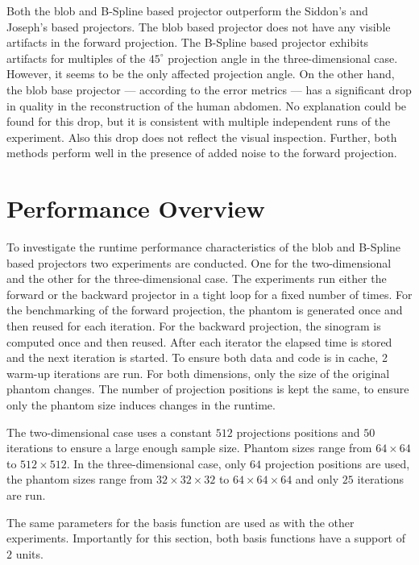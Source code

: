 Both the blob and B-Spline based projector outperform the Siddon's and Joseph's based projectors.
The blob based projector does not have any visible artifacts in the forward projection. The B-Spline
based projector exhibits artifacts for multiples of the \(45^\circ\) projection angle in the
three-dimensional case. However, it seems to be the only affected projection angle. On the other
hand, the blob base projector --- according to the error metrics --- has a significant drop in
quality in the reconstruction of the human abdomen. No explanation could be found for this drop, but
it is consistent with multiple independent runs of the experiment. Also this drop does not reflect
the visual inspection. Further, both methods perform well in the presence of added noise to the
forward projection.

\section{Performance Overview}\label{sec:experiments_performance_projection}

To investigate the runtime performance characteristics of the blob and B-Spline based projectors two
experiments are conducted. One for the two-dimensional and the other for the three-dimensional case.
The experiments run either the forward or the backward projector in a tight loop for a fixed number
of times. For the benchmarking of the forward projection, the phantom is generated once and then
reused for each iteration. For the backward projection, the sinogram is computed once and then
reused. After each iterator the elapsed time is stored and the next iteration is started. To ensure
both data and code is in cache, 2 warm-up iterations are run. For both dimensions, only the size of
the original phantom changes. The number of projection positions is kept the same, to ensure only
the phantom size induces changes in the runtime.

The two-dimensional case uses a constant \(512\) projections positions and \(50\) iterations to
ensure a large enough sample size. Phantom sizes range from \(64 \times 64\) to \(512 \times 512\).
In the three-dimensional case, only \(64\) projection positions are used, the phantom sizes range
from \(32 \times 32 \times 32\) to \(64 \times 64 \times 64\) and only \(25\) iterations are run.

The same parameters for the basis function are used as with the other experiments. Importantly for
this section, both basis functions have a support of \(2\) units.

